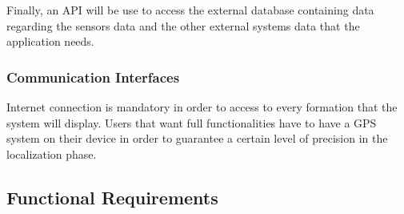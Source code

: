 \documentclass[table, 12pt]{article}
\begin{document}
Finally, an API will be use to access the external database containing data regarding the sensors data and the other external systems data that the application needs.

\subsubsection{Communication Interfaces}
Internet connection is mandatory in order to access to every formation that the system will display.
Users that want full functionalities have to have a GPS system on their device in order to guarantee a certain level of precision in the localization phase.

\subsection{Functional Requirements}
\end{document}
